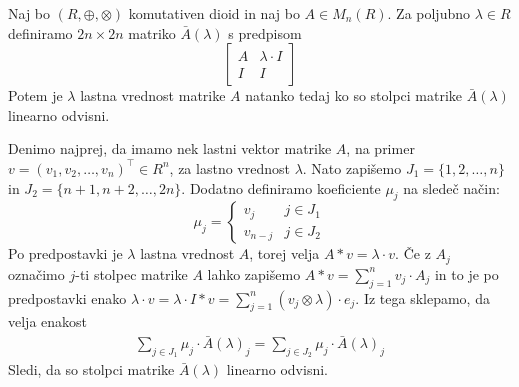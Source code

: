 \documentclass[mat1]{fmfdelo}
\begin{document}
\begin{izrek}
Naj bo $(R, \oplus, \otimes)$ komutativen dioid in naj bo $A\in M_n(R)$. Za poljubno $\lambda \in R$ definiramo $2n\times 2n$ matriko $\bar{A}(\lambda)$ s predpisom $$\begin{bmatrix}
	A & \lambda\cdot I \\
	I & I
\end{bmatrix}$$
Potem je $\lambda$ lastna vrednost matrike $A$ natanko tedaj ko so stolpci matrike $\bar{A}(\lambda)$ linearno odvisni.
\end{izrek}
\begin{dokaz}
	Denimo najprej, da imamo nek lastni vektor matrike $A$, na primer $v = (v_1, v_2, \ldots, v_n)^\top\in R^n$, za lastno vrednost $\lambda$. Nato zapišemo $J_1 = \{1, 2, \ldots, n\}$ in $J_2 = \{n+1, n+2, \ldots, 2n\}$. Dodatno definiramo koeficiente $\mu_j$ na sledeč način: $$\mu_j = \begin{cases}
		v_j & j\in J_1 \\
		v_{n-j} & j\in J_2
	\end{cases}$$
	Po predpostavki je $\lambda$ lastna vrednost $A$, torej velja $A * v = \lambda\cdot v$. Če z $A_j$ označimo $j$-ti stolpec matrike $A$ lahko zapišemo $A*v = \sum_{j = 1}^{n} v_j \cdot A_j$ in to je po predpostavki enako $\lambda\cdot v = \lambda \cdot I*v = \sum_{j = 1}^{n}(v_j \otimes \lambda ) \cdot e_j$. Iz tega sklepamo, da velja enakost \begin{align} \label{eq:eigendep}
		\sum_{j\in J_1}\mu_j \cdot \bar{A}(\lambda)_j = \sum_{j\in J_2}\mu_j \cdot \bar{A}(\lambda)_j
	\end{align} Sledi, da so stolpci matrike $\bar{A}(\lambda)$ linearno odvisni.
	

\end{dokaz}
\end{document}
